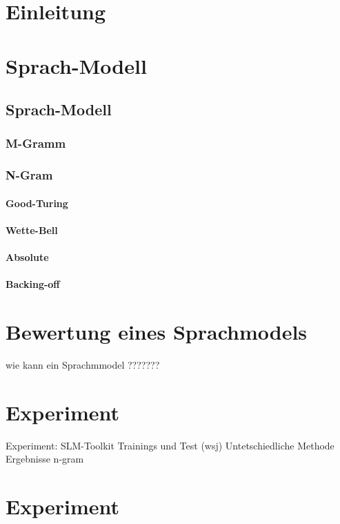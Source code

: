 \chapter{Einleitung}
\label{chapter:Einleitung}
	
	
\chapter{Sprach-Modell}
\label{chapter:Sprach-Modell}

\section{Sprach-Modell}
	

	\subsection{M-Gramm}
  
  
  \subsection{N-Gram}
		
		\subsubsection{Good-Turing}
		\subsubsection{Wette-Bell}
		\subsubsection{Absolute}
		\subsubsection{Backing-off}
		
\chapter{Bewertung eines Sprachmodels}
\label{chapter:bewertung_sprachmodel}
wie kann ein Sprachmmodel ???????

\chapter{Experiment}
\label{chapter:Experiment}

	Experiment:
		SLM-Toolkit
		Trainings und Test (wsj)
		Untetschiedliche Methode
		Ergebnisse
		   n-gram
		   
\chapter{Experiment}
\label{chapter:Experiment}
 
